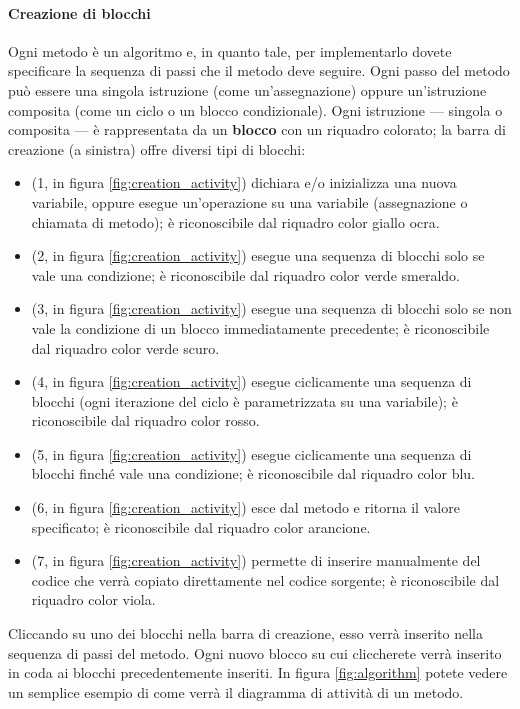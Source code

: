 \paragraph{Creazione di blocchi} Ogni metodo è un algoritmo e, in quanto tale, per implementarlo dovete specificare la sequenza di passi che il metodo deve seguire. Ogni passo del metodo può essere una singola istruzione (come un'assegnazione) oppure un'istruzione composita (come un ciclo o un blocco condizionale). Ogni istruzione --- singola o composita --- è rappresentata da un \textbf{blocco} con un riquadro colorato; la barra di creazione (a sinistra) offre diversi tipi di blocchi:
\begin{itemize}
	\item {} (1, in figura \ref{fig:creation_activity}) dichiara e/o inizializza una nuova variabile, oppure esegue un'operazione su una variabile (assegnazione o chiamata di metodo); è riconoscibile dal riquadro color giallo ocra.
	\item {} (2, in figura \ref{fig:creation_activity}) esegue una sequenza di blocchi solo se vale una condizione; è riconoscibile dal riquadro color verde smeraldo.
	\item {} (3, in figura \ref{fig:creation_activity}) esegue una sequenza di blocchi solo se non vale la condizione di un blocco  immediatamente precedente; è riconoscibile dal riquadro color verde scuro.
	\item {} (4, in figura \ref{fig:creation_activity}) esegue ciclicamente una sequenza di blocchi (ogni iterazione del ciclo è parametrizzata su una variabile); è riconoscibile dal riquadro color rosso.
	\item {} (5, in figura \ref{fig:creation_activity}) esegue ciclicamente una sequenza di blocchi finché vale una condizione; è riconoscibile dal riquadro color blu.
	\item {} (6, in figura \ref{fig:creation_activity}) esce dal metodo e ritorna il valore specificato; è riconoscibile dal riquadro color arancione.
	\item {} (7, in figura \ref{fig:creation_activity}) permette di inserire manualmente del codice che verrà copiato direttamente nel codice sorgente; è riconoscibile dal riquadro color viola.
\end{itemize}
Cliccando su uno dei blocchi nella barra di creazione, esso verrà inserito nella sequenza di passi del metodo. Ogni nuovo blocco su cui cliccherete verrà inserito in coda ai blocchi precedentemente inseriti. In figura \ref{fig:algorithm} potete vedere un semplice esempio di come verrà il diagramma di attività di un metodo.

